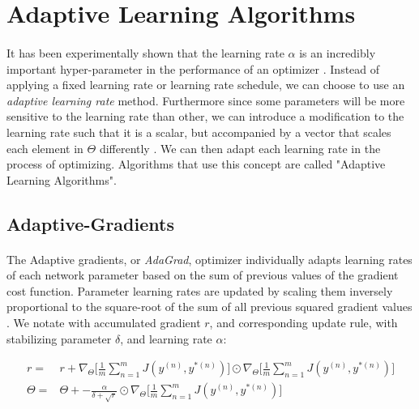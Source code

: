 \documentclass[12pt,letterpaper]{article}
\begin{document}
\newpage

\section{Adaptive Learning Algorithms}

\paragraph*{}It has been experimentally shown that the learning rate $\alpha$ is an incredibly important hyper-parameter in the performance of an optimizer \cite{Geron}. Instead of applying a fixed learning rate or learning rate schedule, we can choose to use an \textit{adaptive learning rate} method. Furthermore since some parameters will be more sensitive to the learning rate than other, we can introduce a modification to the learning rate such that it is a scalar, but accompanied by a vector that scales each element in $\Theta$ differently \cite{Goodfellow}. We can then adapt each learning rate in the process of optimizing. Algorithms that use this concept are called "Adaptive Learning Algorithms".


\subsection{Adaptive-Gradients}

\paragraph*{}The Adaptive gradients, or \textit{AdaGrad}, optimizer individually adapts learning rates of each network parameter based on the sum of previous values of the gradient cost function. Parameter learning rates are updated by scaling them inversely proportional to the square-root of the sum of all previous squared gradient values \cite{Goodfellow,Geron}. We notate with accumulated gradient $r$,  and corresponding update rule, with stabilizing parameter $\delta$, and learning rate $\alpha$:

\begin{equation}
\label{AdaGrad update}
\begin{split}
r =& r + \nabla_{\Theta} \Big[ \frac{1}{m} \sum_{n=1}^{m} J(y^{(n)},y^{*(n)}) \Big] 
\odot \nabla_{\Theta} \Big[ \frac{1}{m} \sum_{n=1}^{m} J(y^{(n)},y^{*(n)}) \Big] \\
\Theta =& \Theta + -\frac{\alpha}{\delta + \sqrt{r}} \odot \nabla_{\Theta} \Big[ \frac{1}{m} \sum_{n=1}^{m} J(y^{(n)},y^{*(n)}) \Big] 
\end{split}
\end{equation}
\end{document}
